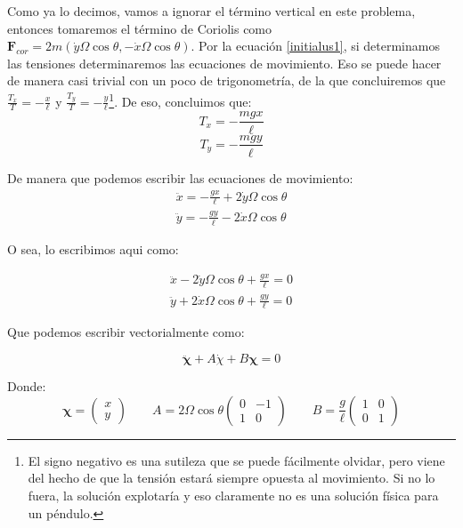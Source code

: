 \documentclass[a4paper,12pt]{article}
\begin{document}
Como ya lo decimos, vamos a ignorar el término vertical en este problema, entonces tomaremos el término de Coriolis como $\boldsymbol{F}_{cor}= 2 m (\dot{y}\Omega \cos\theta, -\dot{x}\Omega \cos\theta )$. Por la ecuación \eqref{initialus1}, si determinamos las tensiones determinaremos las ecuaciones de movimiento. Eso se puede hacer de manera casi trivial con un poco de trigonometría, de la que concluiremos que $\frac{T_x}{T} = -\frac{x}{\ell} $ y $\frac{T_y}{T} = -\frac{y}{\ell}$\footnote{El signo negativo es una sutileza que se puede fácilmente olvidar, pero viene del hecho de que la tensión estará siempre opuesta al movimiento. Si no lo fuera, la solución explotaría y eso claramente no es una solución física para un péndulo.}. De eso, concluimos que:
$$T_x = -\frac{mgx}{\ell} $$
$$T_y = -\frac{mgy}{\ell} $$

De manera que podemos escribir las ecuaciones de movimiento:
\begin{equation}
  \begin{aligned}
    \ddot{x} = -\frac{g x}{\ell} + 2\dot{y}\Omega \cos\theta\\
    \ddot{y} = -\frac{g y}{\ell} - 2\dot{x}\Omega \cos\theta
  \end{aligned}
\end{equation}

O sea, lo escribimos aqui como:

\begin{equation}
  \begin{aligned}
    \label{eqmov1}
    \ddot{x} - 2\dot{y}\Omega \cos\theta + \frac{g x}{\ell} = 0\\
    \ddot{y}  + 2\dot{x}\Omega \cos\theta + \frac{g y}{\ell} = 0
  \end{aligned}
\end{equation}

Que podemos escribir vectorialmente como:

\begin{equation}
  \ddot{\boldsymbol{\chi}} +A\dot{\chi} + B \boldsymbol{\chi} = 0
\end{equation}

Donde:
\begin{equation}
  \boldsymbol{\chi} = \begin{pmatrix} x \\ y\end{pmatrix} \qquad 
  A = 2\Omega \cos\theta \begin{pmatrix} 0 & -1 \\ 1 & 0\end{pmatrix} \qquad
  B = \frac{g}{\ell} \begin{pmatrix} 1 & 0 \\ 0 & 1\end{pmatrix}
\end{equation}
\end{document}

